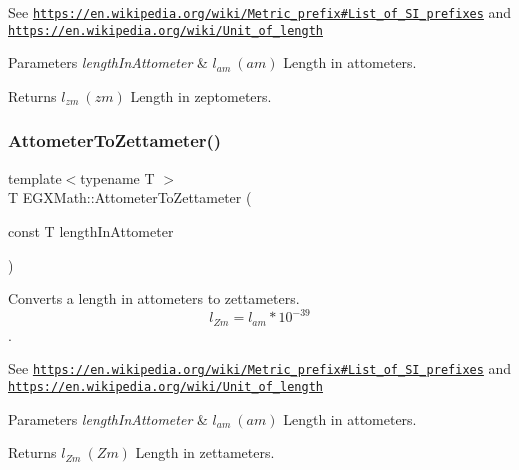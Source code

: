 See \href{https://en.wikipedia.org/wiki/Metric_prefix#List_of_SI_prefixes}{\tt https\+://en.\+wikipedia.\+org/wiki/\+Metric\+\_\+prefix\#\+List\+\_\+of\+\_\+\+S\+I\+\_\+prefixes} and \href{https://en.wikipedia.org/wiki/Unit_of_length}{\tt https\+://en.\+wikipedia.\+org/wiki/\+Unit\+\_\+of\+\_\+length} 
\begin{DoxyParams}{Parameters}
{\em length\+In\+Attometer} & $ l_{am}\ (am)$ Length in attometers. \\
\hline
\end{DoxyParams}
\begin{DoxyReturn}{Returns}
$ l_{zm}\ (zm)$ Length in zeptometers. 
\end{DoxyReturn}
\mbox{\label{group___e_g_x_math-_conversions-_length_conversions-_s_i-_attometer-_s_i_ga64b586463e4d2d7bbc63e43e8205383b}} 
\subsubsection{\texorpdfstring{Attometer\+To\+Zettameter()}{AttometerToZettameter()}}
{\footnotesize\ttfamily template$<$typename T $>$ \\
T E\+G\+X\+Math\+::\+Attometer\+To\+Zettameter (\begin{DoxyParamCaption}\item[{const T}]{length\+In\+Attometer }\end{DoxyParamCaption})}



Converts a length in attometers to zettameters. \[ l_{Zm}=l_{am} * 10^{-39} \]. 

See \href{https://en.wikipedia.org/wiki/Metric_prefix#List_of_SI_prefixes}{\tt https\+://en.\+wikipedia.\+org/wiki/\+Metric\+\_\+prefix\#\+List\+\_\+of\+\_\+\+S\+I\+\_\+prefixes} and \href{https://en.wikipedia.org/wiki/Unit_of_length}{\tt https\+://en.\+wikipedia.\+org/wiki/\+Unit\+\_\+of\+\_\+length} 
\begin{DoxyParams}{Parameters}
{\em length\+In\+Attometer} & $ l_{am}\ (am)$ Length in attometers. \\
\hline
\end{DoxyParams}
\begin{DoxyReturn}{Returns}
$ l_{Zm}\ (Zm)$ Length in zettameters. 
\end{DoxyReturn}
